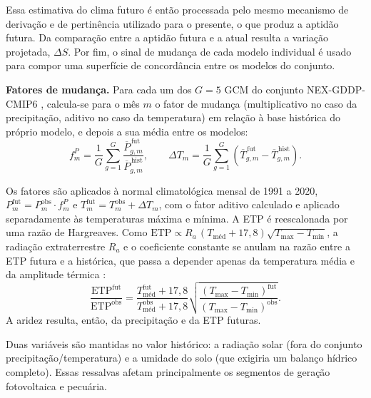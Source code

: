 Essa estimativa do clima futuro é então processada pelo mesmo mecanismo de derivação e de pertinência
utilizado para o presente, o que produz a aptidão futura. Da comparação entre a aptidão futura e a
atual resulta a variação projetada, $\Delta S$. Por fim, o sinal de mudança de cada modelo
individual é usado para compor uma superfície de concordância entre os modelos do conjunto.

\textbf{Fatores de mudança.} Para cada um dos $G = 5$ GCM do conjunto NEX-GDDP-CMIP6
\citep{thrasher_nasa_2022}, calcula-se para o mês $m$ o fator de mudança (multiplicativo no caso da
precipitação, aditivo no caso da temperatura) em relação à base histórica do próprio modelo, e depois
a sua média entre os modelos:
\begin{equation*}
  f^{P}_m = \frac{1}{G}\sum_{g=1}^{G} \frac{\overline{P}^{\,\text{fut}}_{g,m}}
                                              {\overline{P}^{\,\text{hist}}_{g,m}},
   \qquad
   \Delta T_m = \frac{1}{G}\sum_{g=1}^{G}
     \left(\overline{T}^{\,\text{fut}}_{g,m} - \overline{T}^{\,\text{hist}}_{g,m}\right).
\end{equation*}

Os fatores são aplicados à normal climatológica mensal de 1991 a 2020,
$P^{\text{fut}}_m = P^{\text{obs}}_m \cdot f^{P}_m$ e
$T^{\text{fut}}_m = T^{\text{obs}}_m + \Delta T_m$, com o fator aditivo calculado e aplicado
separadamente às temperaturas máxima e mínima. A ETP é reescalonada por uma razão de Hargreaves. Como
$\mathrm{ETP} \propto R_a\,(T_{\text{méd}} + 17{,}8)\sqrt{T_{\max} - T_{\min}}$, a radiação
extraterrestre $R_a$ e o coeficiente constante se anulam na razão entre a ETP futura e a histórica, que
passa a depender apenas da temperatura média e da amplitude térmica
\parencites{george_h_hargreaves_reference_1985}[p.~55, eq.~8]{hargreaves_history_2003}:
\begin{equation*}
  \frac{\mathrm{ETP}^{\text{fut}}}{\mathrm{ETP}^{\text{obs}}} =
  \frac{T^{\text{fut}}_{\text{méd}}+17{,}8}{T^{\text{obs}}_{\text{méd}}+17{,}8}
  \sqrt{\frac{(T_{\max}-T_{\min})^{\text{fut}}}{(T_{\max}-T_{\min})^{\text{obs}}}}.
\end{equation*}
A aridez resulta, então, da precipitação e da ETP futuras.

Duas variáveis são mantidas no valor histórico: a radiação solar (fora do conjunto
precipitação/temperatura) e a umidade do solo (que exigiria um balanço hídrico completo). Essas
ressalvas afetam principalmente os segmentos de geração fotovoltaica e pecuária.

